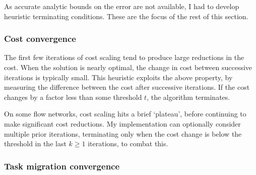 As accurate analytic bounds on the error are not available, I had to develop heuristic terminating conditions. These are the focus of the rest of this section.

%
%

\subsubsection{Cost convergence}


The first few iterations of cost scaling tend to produce large reductions in the cost. When the solution is nearly optimal, the change in cost between successive iterations is typically small. This heuristic exploits the above property, by measuring the difference between the cost after successive iterations. If the cost changes by a factor less than some threshold $t$, the algorithm terminates.

On some flow networks, cost scaling hits a brief `plateau', before continuing to make significant cost reductions. My implementation can optionally consider multiple prior iterations, terminating only when the cost change is below the threshold in the last $k \geq 1$ iterations, to combat this.

\subsubsection{Task migration convergence}

